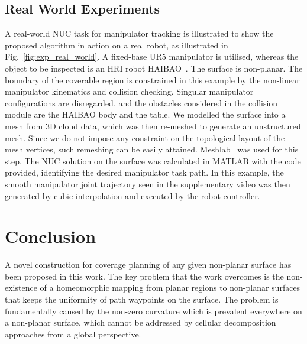 \documentclass[lettersize,journal]{IEEEtran}
\begin{document}
\subsection{Real World Experiments}
A real-world NUC task for manipulator tracking is illustrated to show the proposed algorithm in action on a real robot, as illustrated in Fig.~\ref{fig:exp_real_world}. 
A fixed-base UR5 manipulator is utilised, whereas the object to be inspected is an HRI robot HAIBAO~\cite{Xiong2011Haibao}. 
The surface is non-planar. The boundary of the coverable region is constrained in this example by the non-linear manipulator kinematics and collision checking. 
Singular manipulator configurations are disregarded, and the obstacles considered in the collision module are the HAIBAO body and the table. 
We modelled the surface into a mesh from 3D cloud data, which was then re-meshed to generate an unstructured mesh. 
Since we do not impose any constraint on the topological layout of the mesh vertices, such remeshing can be easily attained. Meshlab~\cite{Cignoni2008Meshlab} was used for this step. 
The NUC solution on the surface was calculated in MATLAB with the code provided, identifying the desired manipulator task path. In this example, the smooth manipulator joint trajectory 
seen in the supplementary video was then generated by cubic interpolation and executed by the robot controller.

\section{Conclusion}\label{section_conclusion}
A novel construction for coverage planning of any given non-planar surface has been proposed in this work. 
The key problem that the work overcomes is the non-existence of a homeomorphic mapping from planar regions to non-planar surfaces that keeps 
the uniformity of path waypoints on the surface. The problem is fundamentally caused by the non-zero curvature which is prevalent everywhere on a non-planar surface, which cannot be addressed by cellular decomposition approaches 
from a global perspective. 
\end{document}

